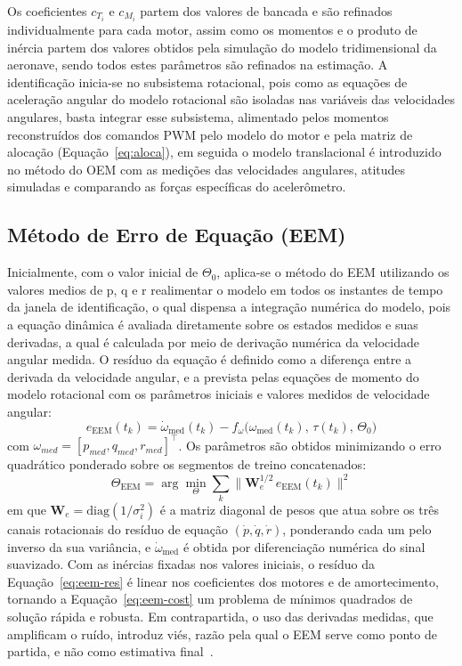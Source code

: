 \documentclass{ieeeaccess}
\begin{document}
Os coeficientes $c_{T_i}$ e $c_{M_i}$ partem dos valores de bancada e são refinados individualmente para cada motor, assim como os momentos e o produto de inércia partem dos valores obtidos pela simulação do modelo tridimensional da aeronave, sendo todos estes parâmetros são refinados na estimação. A identificação inicia-se no subsistema rotacional, pois como as equações de aceleração angular do modelo rotacional são isoladas nas variáveis das velocidades angulares, basta integrar esse subsistema, alimentado pelos momentos reconstruídos dos comandos PWM pelo modelo do motor e pela matriz de alocação (Equação~\eqref{eq:aloca}), em seguida o modelo translacional é introduzido no método do OEM com as medições das velocidades angulares, atitudes simuladas e comparando as forças específicas do acelerômetro.

\subsection{Método de Erro de Equação (EEM)}

Inicialmente, com o valor inicial de $\Theta_0$, aplica-se o método do EEM utilizando os valores medios de p, q e r realimentar o modelo em todos os instantes de tempo da janela de identificação, o qual dispensa a integração numérica do modelo, pois a equação dinâmica é avaliada diretamente sobre os estados medidos e suas derivadas, a qual é calculada por meio de derivação numérica da velocidade angular medida. O resíduo da equação é definido como a diferença entre a derivada da velocidade angular, e a prevista pelas equações de momento do modelo rotacional com os parâmetros iniciais e valores medidos de velocidade angular:
\begin{equation}
e_{\text{EEM}}(t_k) = \dot{\omega}_{\text{med}}(t_k) - f_\omega\big(\omega_{\text{med}}(t_k),\, \tau(t_k),\, \Theta_0\big)
\label{eq:eem-res}
\end{equation}
com $\omega_{med} = [p_{med}, q_{med}, r_{med}]^{\top}$. Os parâmetros são obtidos minimizando o erro quadrático ponderado sobre os segmentos de treino concatenados:
\begin{equation}
\Theta_{\text{EEM}} = \arg\min_{\Theta} \sum_{k} \big\| \mathbf{W}_e^{1/2}\, e_{\text{EEM}}(t_k) \big\|^2
\label{eq:eem-cost}
\end{equation}
em que $\mathbf{W}_e = \mathrm{diag}(1/\sigma_i^2)$ é a matriz diagonal de pesos que atua sobre os três canais rotacionais do resíduo de equação $(\dot{p},\dot{q},\dot{r})$, ponderando cada um pelo inverso da sua variância, e $\dot{\omega}_{\text{med}}$ é obtida por diferenciação numérica do sinal suavizado. Com as inércias fixadas nos valores iniciais, o resíduo da Equação~\eqref{eq:eem-res} é linear nos coeficientes dos motores e de amortecimento, tornando a Equação~\eqref{eq:eem-cost} um problema de mínimos quadrados de solução rápida e robusta. Em contrapartida, o uso das derivadas medidas, que amplificam o ruído, introduz viés, razão pela qual o EEM serve como ponto de partida, e não como estimativa final~\cite{c2}.
\end{document}
